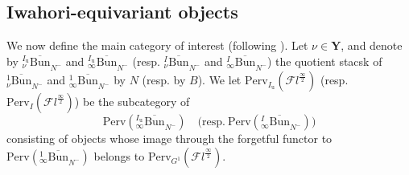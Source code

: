 \documentclass[11pt]{amsart}
\theoremstyle{plain}
\theoremstyle{remark}
\numberwithin{equation}{section}
\begin{document}
	\subsection{Iwahori-equivariant objects}\label{section Iwahori-equivariant objects} We now define the main category of interest (following \cite[§4.4.3]{ABBGM}). Let $\nu\in\mathbf{Y}$, and denote by ${^{I_{\mathrm{u}}}_\nu\overline{\mathrm{Bun}}}_{N^-}$ and ${^{I_{\mathrm{u}}}_\infty\overline{\mathrm{Bun}}}_{N^-}$ (resp. ${^{I}_\nu\overline{\mathrm{Bun}}}_{N^-}$ and ${^{I}_\infty\overline{\mathrm{Bun}}}_{N^-}$) the quotient stacsk of ${^1_\nu\overline{\mathrm{Bun}}}_{N^-}$ and  ${^1_\infty\overline{\mathrm{Bun}}}_{N^-}$ by $N$ (resp. by $B$). We let $\mathrm{Perv}_{I_{\mathrm{u}}}(\mathcal{F}l^{\frac{\infty}{2}})$ (resp. $\mathrm{Perv}_{I}(\mathcal{F}l^{\frac{\infty}{2}})$) be the subcategory of 
 $$\mathrm{Perv}({^{I_{\mathrm{u}}}_\infty\overline{\mathrm{Bun}}}_{N^-})\quad \text{(resp.}~ \mathrm{Perv}({^{I}_\infty\overline{\mathrm{Bun}}}_{N^-}))$$ 
 consisting of objects whose image through the forgetful functor to $ \mathrm{Perv}({^{1}_\infty\overline{\mathrm{Bun}}}_{N^-})$ belongs to $\mathrm{Perv}_{G^1}(\mathcal{F}l^{\frac{\infty}{2}})$. 
	
\end{document}
